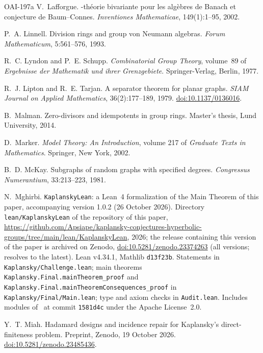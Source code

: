 \documentclass[11pt]{article}
\theoremstyle{definition}
\theoremstyle{plain}
\newcommand{\doi}[1]{\href{https://doi.org/#1}{doi:#1}}
\newcommand{\leanrepo}{\url{https://github.com/Apsiape/kaplansky-conjectures-hyperbolic-groups/tree/main/lean/KaplanskyLean}}
\begin{document}
\begin{thebibliography}{OAI-197a}
V.~Lafforgue.
-th\'eorie bivariante pour les alg\`ebres de Banach et conjecture de Baum--Connes.
\newblock \emph{Inventiones Mathematicae}, 149(1):1--95, 2002.

P.~A. Linnell.
\newblock Division rings and group von Neumann algebras.
\newblock \emph{Forum Mathematicum}, 5:561--576, 1993.

R.~C. Lyndon and P.~E. Schupp.
\newblock \emph{Combinatorial Group Theory}, volume~89 of \emph{Ergebnisse der Mathematik und ihrer Grenzgebiete}.
\newblock Springer-Verlag, Berlin, 1977.

R.~J. Lipton and R.~E. Tarjan.
\newblock A separator theorem for planar graphs.
\newblock \emph{SIAM Journal on Applied Mathematics}, 36(2):177--189, 1979. \doi{10.1137/0136016}.

B.~Malman.
\newblock Zero-divisors and idempotents in group rings.
\newblock Master's thesis, Lund University, 2014.

D.~Marker.
\newblock \emph{Model Theory: An Introduction}, volume 217 of \emph{Graduate Texts in Mathematics}.
\newblock Springer, New York, 2002.

B.~D. McKay.
\newblock Subgraphs of random graphs with specified degrees.
\newblock \emph{Congressus Numerantium}, 33:213--223, 1981.

N.~Mghirbi.
\newblock \texttt{KaplanskyLean}: a Lean~4 formalization of the Main Theorem of this paper, accompanying version 1.0.2 (26 October 2026).
\newblock Directory \texttt{lean/KaplanskyLean} of the repository of this paper, \leanrepo, 2026; the release containing this version of the paper is archived on Zenodo, \doi{10.5281/zenodo.23374263} (all versions; resolves to the latest).
\newblock Lean v4.34.1, Mathlib \texttt{d13f23b}. Statements in \texttt{Kaplansky/Challenge.lean}; main theorems \texttt{Kaplansky.Final.mainTheorem\_proof} and \texttt{Kaplansky.Final.mainTheoremConsequences\_proof} in \texttt{Kaplansky/Final/Main.lean}; type and axiom checks in \texttt{Audit.lean}. Includes modules of~\cite{OAIlean} at commit \texttt{1581d4c} under the Apache License~2.0.

Y.~T. Miah.
\newblock Hadamard designs and incidence repair for {K}aplansky's direct-finiteness problem.
\newblock Preprint, Zenodo, 19 October 2026. \doi{10.5281/zenodo.23485436}.


\end{thebibliography}
\end{document}
